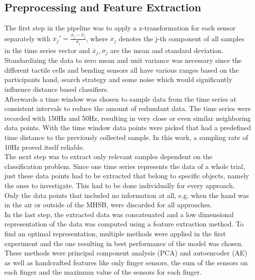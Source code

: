 \subsection{Preprocessing and Feature Extraction}
The first step in the pipeline was to apply a z-transformation for each sensor separately with $ x_{j}' = \frac{x_{j}-\bar{x}_{j}}{\sigma_{j}} $, where $ x_{j} $ denotes the j-th component of all samples in the time series vector and $ \bar{x}_{j},\sigma_{j} $ are the mean and standard deviation. Standardizing the data to zero mean and unit variance was necessary since the different tactile cells and bending sensors all have various ranges based on the participants hand, search strategy and some noise which would significantly influence distance based classifiers.\\
Afterwards a time window was chosen to sample data from the time series at consistent intervals to reduce the amount of redundant data. The time series were recorded with 150Hz and 50Hz, resulting in very close or even similar neighboring data points. With the time window data points were picked that had a predefined time distance to the previously collected sample. In this work, a sampling rate of 10Hz proved itself reliable.\\
The next step was to extract only relevant samples dependent on the classification problem. Since one time series represents the data of a whole trial, just these data points had to be extracted that belong to specific objects, namely the ones to investigate. This had to be done individually for every approach. Only the data points that included no information at all, e.g. when the hand was in the air or outside of the MHSB, were discarded for all approaches. \\
In the last step, the extracted data was concatenated and a low dimensional representation of the data was computed using a feature extraction method. To find an optimal representation, multiple methods were applied in the first experiment and the one resulting in best performance of the model was chosen. These methods were principal component analysis (PCA) and autoencoder (AE) as well as handcrafted features like only finger sensors, the sum of the sensors on each finger and the maximum value of the sensors for each finger.

